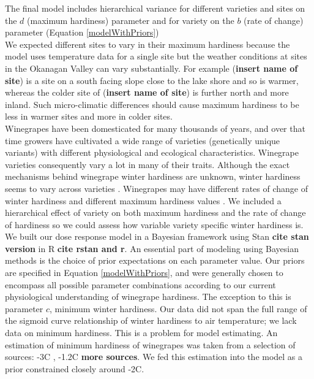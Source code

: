 \documentclass[11pt,letter]{article}
\begin{document}
The final model includes hierarchical variance for different varieties and sites on the $d$ (maximum hardiness) parameter and for variety on the $b$ (rate of change) parameter (Equation \ref{modelWithPriors}) \\

We expected different sites to vary in their maximum hardiness because the model uses temperature data for a single site but the weather conditions at sites in the Okanagan Valley can vary substantially. For example (\textbf{insert name of site}) is a site on a south facing slope close to the lake shore and so is warmer, whereas the colder site of (\textbf{insert name of site}) is further north and more inland. Such micro-climatic differences should cause maximum hardiness to be less in warmer sites and more in colder sites. \\

Winegrapes have been domesticated for many thousands of years, and over that time growers have cultivated a wide range of varieties (genetically unique variants) with different physiological and ecological characteristics. Winegrape varieties consequently vary a lot in many of their traits. Although the exact mechanisms behind winegrape winter hardiness are unknown, winter hardiness seems to vary across varieties \cite{Mills2006,Ferguson2014,Kovaleski2018a}. Winegrapes may have different rates of change of winter hardiness\cite{Kovaleski2018a,Ferguson2014} and different maximum hardiness values \cite{Ferguson2014}. We included a hierarchical effect of variety on both maximum hardiness and the rate of change of hardiness so we could assess how variable variety specific winter hardiness is. \\

We built our dose response model in a Bayesian framework using Stan \textbf{cite stan version} in R \textbf{cite rstan and r}. An essential part of modeling using Bayesian methods is the choice of prior expectations on each parameter value. Our priors are specified in Equation \ref{modelWithPriors}, and were generally chosen to encompass all possible parameter combinations according to our current physiological understanding of winegrape hardiness. The exception to this is parameter $c$, minimum winter hardiness. Our data did not span the full range of the sigmoid curve relationship of winter hardiness to air temperature; we lack data on minimum hardiness. This is a problem for model estimating. An estimation of minimum hardiness of winegrapes was taken from a selection of sources: -3\textdegree C \cite{Ferguson2011}, -1.2\textdegree C \cite{Ferguson2014} \textbf{more sources}. We fed this estimation into the model as a prior constrained closely around -2\textdegree C.  
\end{document}
